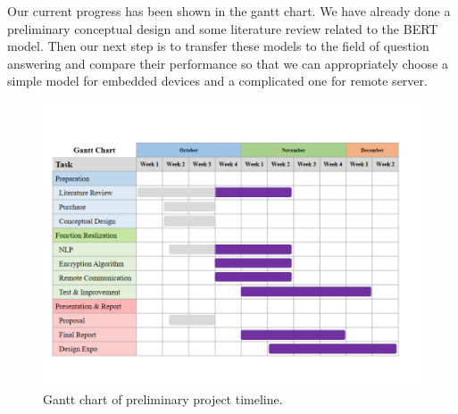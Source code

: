 \documentclass[a4paper]{article}
\begin{document}
Our current progress has been shown in the gantt chart. We have already done a preliminary conceptual design and some literature review related to the BERT model. Then our next step is to transfer these models to the field of question answering and compare their performance so that we can appropriately choose a simple model for embedded devices and a complicated one for remote server.
\begin{figure}[H]
    \centering
    \includegraphics[width=1\textwidth]{Gantt Chart.png}
    \caption{Gantt chart of preliminary project timeline.}
\end{figure}
\printbibliography
\end{document}
